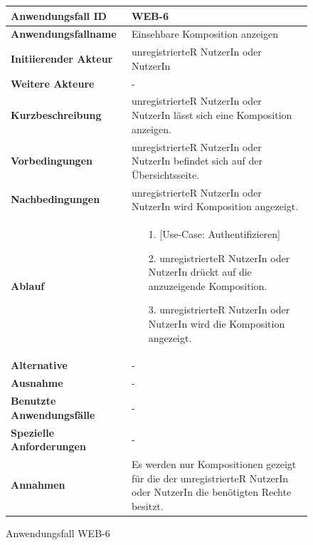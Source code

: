 \begin{figure}[h]
	\centering
	\begin{tabularx}{\textwidth}{ X | X }
		\textbf{Anwendungsfall ID} & WEB-6 \\ \hline
		\textbf{Anwendungsfallname} & Einsehbare Komposition anzeigen \\ \hline
		\textbf{Initiierender Akteur} & unregistrierteR NutzerIn oder NutzerIn \\ \hline
		\textbf{Weitere Akteure} & - \\ \hline
		\textbf{Kurzbeschreibung} & unregistrierteR NutzerIn oder NutzerIn lässt sich eine Komposition anzeigen. \\ \hline
		\textbf{Vorbedingungen} & unregistrierteR NutzerIn oder NutzerIn befindet sich auf der Übersichtsseite. \\ \hline
		\textbf{Nachbedingungen} & unregistrierteR NutzerIn oder NutzerIn wird Komposition angezeigt. \\ \hline
		\textbf{Ablauf} &
		\begin{enumerate}
			\item[1.] [Use-Case: Authentifizieren]
			\item[2.] unregistrierteR NutzerIn oder NutzerIn drückt auf die anzuzeigende Komposition.
			\item[3.] unregistrierteR NutzerIn oder NutzerIn wird die Komposition angezeigt.
		\end{enumerate} \\ \hline
		\textbf{Alternative} & - \\ \hline
		\textbf{Ausnahme} & - \\ \hline
		\textbf{Benutzte Anwendungsfälle} & - \\ \hline
		\textbf{Spezielle Anforderungen} & - \\ \hline
		\textbf{Annahmen} & Es werden nur Kompositionen gezeigt für die der unregistrierteR NutzerIn oder NutzerIn die benötigten Rechte besitzt.
	\end{tabularx}
	\caption{Anwendungsfall WEB-6}
	\label{fig:anwendungsfall-server-tabelle-web-6}
\end{figure}